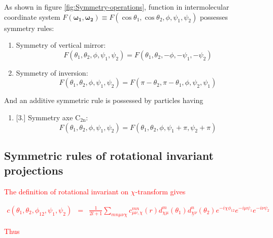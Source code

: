As shown in figure \ref{fig:Symmetry-operations}, function in intermolecular
coordinate system $F(\boldsymbol{\omega_{1}},\boldsymbol{\omega_{2}})\equiv F(\cos\theta_{1},\cos\theta_{2},\phi,\psi_{1},\psi_{2})$
possesses symmetry rules:
\begin{enumerate}
\item Symmetry of vertical mirror: 
\begin{equation}
F(\theta_{1},\theta_{2},\phi,\psi_{1},\psi_{2})=F(\theta_{1},\theta_{2},-\phi,-\psi_{1},-\psi_{2})
\end{equation}

\item Symmetry of inversion: 
\begin{equation}
F(\theta_{1},\theta_{2},\phi,\psi_{1},\psi_{2})=F(\pi-\theta_{2},\pi-\theta_{1},\phi,\psi_{2},\psi_{1})
\end{equation}

\end{enumerate}
And an additive symmetric rule is possessed by particles having 
\begin{enumerate}
\item {}%
[3.]%
Symmetry axe $\mathrm{C_{2n}}$: 
\begin{equation}
F(\theta_{1},\theta_{2},\phi,\psi_{1},\psi_{2})=F(\theta_{1},\theta_{2},\phi,\psi_{1}+\pi,\psi_{2}+\pi)
\end{equation}

\end{enumerate}

\subsection{Symmetric rules of rotational invariant projections}

\textcolor{red}{The definition of rotational invariant on $\chi$-transform
gives}

\textcolor{red}{
\begin{eqnarray*}
c(\theta_{1},\theta_{2},\phi_{12},\psi_{1},\psi_{2}) & = & \frac{1}{2l+1}\sum_{mn\mu\nu\chi}c_{\mu\nu,\chi}^{mn}(r)d_{\chi\mu}^{m}(\theta_{1})d_{\underline{\chi}\nu}^{n}(\theta_{2})e^{-i\chi\phi_{12}}e^{-i\mu\psi_{1}}e^{-i\nu\psi_{2}}
\end{eqnarray*}
}

\textcolor{red}{Thus}

